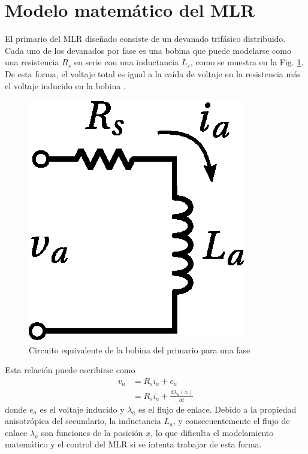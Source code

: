 \section{Modelo matemático del MLR}
El primario del MLR diseñado consiste de un devanado trifásico distribuido. Cada uno de los devanados por fase es una bobina que puede modelarse como una resistencia $R_s$ en serie con una inductancia $L_s$, como se muestra en la Fig. \ref{fig:primarycircuit}. De esta forma, el voltaje total es igual a la caída de voltaje en la resistencia más el voltaje inducido en la bobina \cite{fitzgerald2003}.
\begin{figure}[t]
\centering
\includegraphics[scale=0.5]{../img/Teoria_del_MLR/primarycircuit.eps}
\caption{Circuito equivalente de la bobina del primario para una fase}
\label{fig:primarycircuit}
\end{figure}
Esta relación puede escribirse como
\begin{align*}
v_a &= R_s i_a + e_a\\
&= R_s i_a + \frac{d\lambda_a(x)}{dt}
\end{align*}
donde $e_a$ es el voltaje inducido y $\lambda_a$ es el flujo de enlace. Debido a la propiedad anisotrópica del secundario, la inductancia $L_a$, y consecuentemente el flujo de enlace $\lambda_a$ son funciones de la posición $x$, lo que dificulta el modelamiento matemático y el control del MLR si se intenta trabajar de esta forma.

